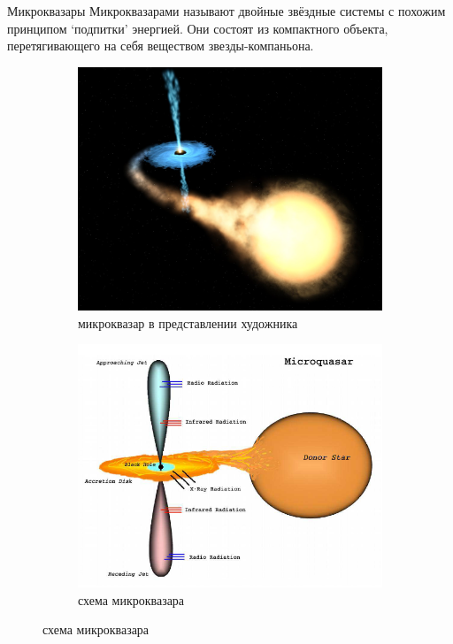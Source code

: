\documentclass[8pt]{beamer}
\begin{document}
\begin{frame}{Микроквазары}
    Микроквазарами называют двойные звёздные системы с похожим принципом `подпитки' энергией. Они состоят из компактного объекта, перетягивающего на себя веществом звезды-компаньона.
    \begin{figure}
        \begin{subfigure}{0.45\textwidth}
            \centering
            \includegraphics[width=\textwidth]{resources/accretion-disk-illustration.jpg}
            \caption{микроквазар в представлении художника}
        \end{subfigure}
        \begin{subfigure}{0.45\textwidth}
            \centering
            \includegraphics[width=\textwidth]{resources/microquasar-scheme.png}
            \caption{схема микроквазара}
        \end{subfigure}
    \end{figure}
\end{frame}
\end{document}

